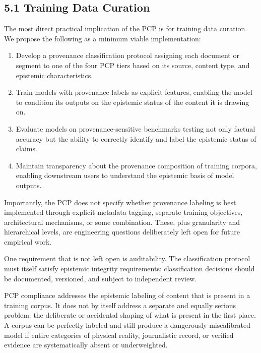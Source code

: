 \documentclass[
]{article}
\begin{document}
\subsection{5.1 Training Data Curation}\label{training-data-curation}

The most direct practical implication of the PCP is for training data
curation. We propose the following as a minimum viable implementation:

\begin{enumerate}
\def\labelenumi{\arabic{enumi}.}
\item
  Develop a provenance classification protocol assigning each document
  or segment to one of the four PCP tiers based on its source, content
  type, and epistemic characteristics.
\item
  Train models with provenance labels as explicit features, enabling the
  model to condition its outputs on the epistemic status of the content
  it is drawing on.
\item
  Evaluate models on provenance-sensitive benchmarks testing not only
  factual accuracy but the ability to correctly identify and label the
  epistemic status of claims.
\item
  Maintain transparency about the provenance composition of training
  corpora, enabling downstream users to understand the epistemic basis
  of model outputs.
\end{enumerate}

Importantly, the PCP does not specify whether provenance labeling is
best implemented through explicit metadata tagging, separate training
objectives, architectural mechanisms, or some combination. These, plus
granularity and hierarchical levels, are engineering questions
deliberately left open for future empirical work.

One requirement that is not left open is auditability. The
classification protocol must itself satisfy epistemic integrity
requirements: classification decisions should be documented, versioned,
and subject to independent review.

PCP compliance addresses the epistemic labeling of content that is
present in a training corpus. It does not by itself address a separate
and equally serious problem: the deliberate or accidental shaping of
what is present in the first place. A corpus can be perfectly labeled
and still produce a dangerously miscalibrated model if entire categories
of physical reality, journalistic record, or verified evidence are
systematically absent or underweighted.
\end{document}
